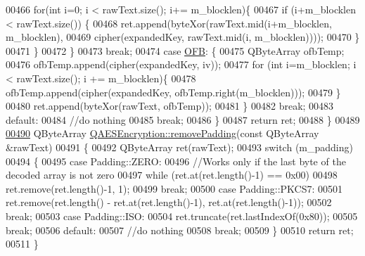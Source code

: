 \begin{DoxyCode}
00466             \textcolor{keywordflow}{for}(\textcolor{keywordtype}{int} i=0; i < rawText.size(); i+= m\_blocklen)\{
00467                 \textcolor{keywordflow}{if} (i+m\_blocklen < rawText.size()) \{
00468                     ret.append(byteXor(rawText.mid(i+m\_blocklen, m\_blocklen),
00469                                        cipher(expandedKey, rawText.mid(i, m\_blocklen))));
00470                 \}
00471             \}
00472         \}
00473         \textcolor{keywordflow}{break};
00474     \textcolor{keywordflow}{case} \hyperlink{class_q_a_e_s_encryption_ad3e031c49a3d56566379d75b40b7b255a27e2f82decd94080893d61db4a8adcb3}{OFB}: \{
00475         QByteArray ofbTemp;
00476         ofbTemp.append(cipher(expandedKey, iv));
00477         \textcolor{keywordflow}{for} (\textcolor{keywordtype}{int} i=m\_blocklen; i < rawText.size(); i += m\_blocklen)\{
00478             ofbTemp.append(cipher(expandedKey, ofbTemp.right(m\_blocklen)));
00479         \}
00480         ret.append(byteXor(rawText, ofbTemp));
00481     \}
00482         \textcolor{keywordflow}{break};
00483     \textcolor{keywordflow}{default}:
00484         \textcolor{comment}{//do nothing}
00485         \textcolor{keywordflow}{break};
00486     \}
00487     \textcolor{keywordflow}{return} ret;
00488 \}
00489 
\hypertarget{qaesencryption_8cpp_source.tex_l00490}{}\hyperlink{class_q_a_e_s_encryption_a4dc7e77485e5a3e63eebc99b9386c17b}{00490} QByteArray \hyperlink{class_q_a_e_s_encryption_a4dc7e77485e5a3e63eebc99b9386c17b}{QAESEncryption::removePadding}(\textcolor{keyword}{const} QByteArray &rawText)
00491 \{
00492     QByteArray ret(rawText);
00493     \textcolor{keywordflow}{switch} (m\_padding)
00494     \{
00495     \textcolor{keywordflow}{case} Padding::ZERO:
00496         \textcolor{comment}{//Works only if the last byte of the decoded array is not zero}
00497         \textcolor{keywordflow}{while} (ret.at(ret.length()-1) == 0x00)
00498             ret.remove(ret.length()-1, 1);
00499         \textcolor{keywordflow}{break};
00500     \textcolor{keywordflow}{case} Padding::PKCS7:
00501         ret.remove(ret.length() - ret.at(ret.length()-1), ret.at(ret.length()-1));
00502         \textcolor{keywordflow}{break};
00503     \textcolor{keywordflow}{case} Padding::ISO:
00504         ret.truncate(ret.lastIndexOf(0x80));
00505         \textcolor{keywordflow}{break};
00506     \textcolor{keywordflow}{default}:
00507         \textcolor{comment}{//do nothing}
00508         \textcolor{keywordflow}{break};
00509     \}
00510     \textcolor{keywordflow}{return} ret;
00511 \}
\end{DoxyCode}
